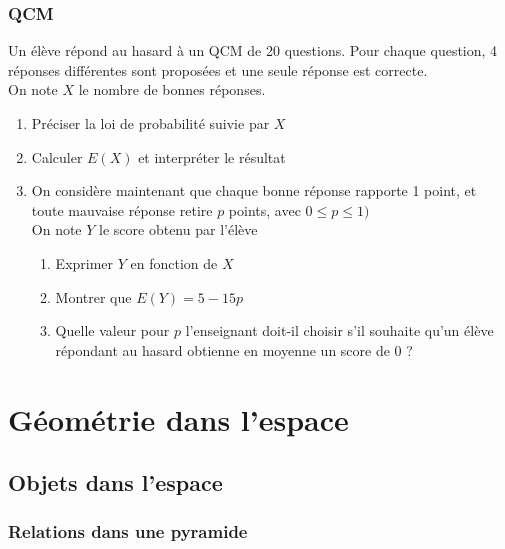 \documentclass[oneside,12pt]{book}          %
\begin{document}
\subsection{QCM}
Un élève répond au hasard à un QCM de 20 questions. Pour chaque question, 4 réponses différentes sont proposées et une seule réponse est correcte.\\
On note $X$ le nombre de bonnes réponses.
\begin{enumerate}
    \item Préciser la loi de probabilité suivie par $X$
    \item Calculer $E(X)$ et interpréter le résultat
    \item On considère maintenant que chaque bonne réponse rapporte 1 point, et toute mauvaise réponse retire $p$ points, avec $0\leq p\leq1)$\\
    On note $Y$ le score obtenu par l'élève
    \begin{enumerate}
        \item Exprimer $Y$ en fonction de $X$
        \item Montrer que $E(Y)=5-15p$
        \item Quelle valeur pour $p$ l'enseignant doit-il choisir s'il souhaite qu'un élève répondant au hasard obtienne en moyenne un score de 0 ?
    \end{enumerate}
\end{enumerate}



\chapter{Géométrie dans l'espace}
\newpage

\section{Objets dans l'espace}

\subsection{Relations dans une pyramide}
\end{document}
